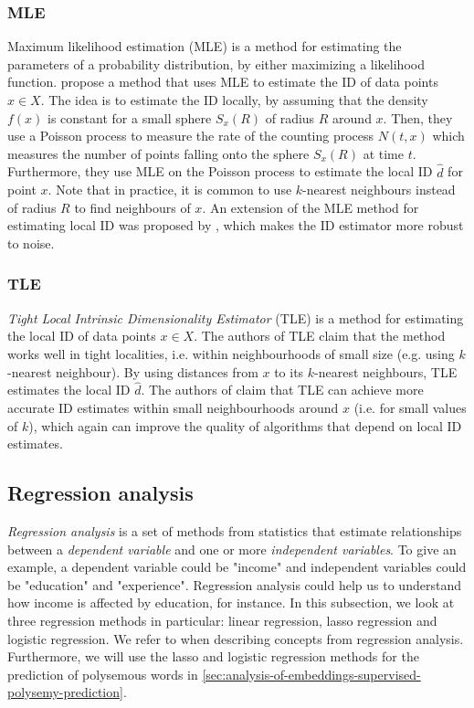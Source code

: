 \subsubsection{MLE}
\label{sec:id-estimation-mle}
Maximum likelihood estimation (MLE) is a method for estimating the parameters of a probability distribution, by either maximizing a likelihood function. \cite{Levina2004} propose a method that uses MLE to estimate the ID of data points $x \in X$. The idea is to estimate the ID locally, by assuming that the density $f(x)$ is constant for a small sphere $S_x(R)$ of radius $R$ around $x$. Then, they use a Poisson process to measure the rate of the counting process $N(t, x)$ which measures the number of points falling onto the sphere $S_x(R)$ at time $t$. Furthermore, they use MLE on the Poisson process to estimate the local ID $\hat{d}$ for point $x$. Note that in practice, it is common to use $k$-nearest neighbours instead of radius $R$ to find neighbours of $x$. An extension of the MLE method for estimating local ID was proposed by \cite{Haro2008}, which makes the ID estimator more robust to noise.

\subsubsection{TLE}
\label{sec:id-estimation-tle}
\textit{Tight Local Intrinsic Dimensionality Estimator} (TLE) \cite{Amsaleg2019} is a method for estimating the local ID of data points $x \in X$. The authors of TLE claim that the method works well in tight localities, i.e. within neighbourhoods of small size (e.g. using $k$-nearest neighbour). By using distances from $x$ to its $k$-nearest neighbours, TLE estimates the local ID $\hat{d}$. The authors of \cite{Amsaleg2019} claim that TLE can achieve more accurate ID estimates within small neighbourhoods around $x$ (i.e. for small values of $k$), which again can improve the quality of algorithms that depend on local ID estimates.

\subsection{Regression analysis}
\label{sec:regression-analysis}
\textit{Regression analysis} is a set of methods from statistics that estimate relationships between a \textit{dependent variable} and one or more \textit{independent variables}. To give an example, a dependent variable could be "income" and independent variables could be "education" and "experience". Regression analysis could help us to understand how income is affected by education, for instance. In this subsection, we look at three regression methods in particular: linear regression, lasso regression and logistic regression. We refer to \cite{James2013,fox2015applied} when describing concepts from regression analysis. Furthermore, we will use the lasso and logistic regression methods for the prediction of polysemous words in \cref{sec:analysis-of-embeddings-supervised-polysemy-prediction}.

